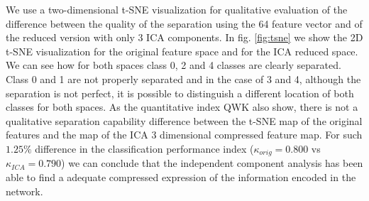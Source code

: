 \documentclass[review]{elsarticle}
\theoremstyle{definition} %
\theoremstyle{remark}
\begin{document}
We use a two-dimensional t-SNE visualization \cite{maaten2008visualizing} for qualitative evaluation of the difference between the quality of the separation using the 64 feature vector and of the reduced version with only 3 ICA components. In fig. \ref{fig:tsne} we show the 2D t-SNE visualization for the original feature space and for the ICA reduced space. We can see how for both spaces class 0, 2 and 4 classes are clearly separated. Class 0 and 1 are not properly separated and in the case of 3 and 4, although the separation is not perfect, it is possible to distinguish a different location of both classes for both spaces. As the quantitative index QWK also show, there is not a qualitative separation capability difference between the t-SNE map of the original features and the map of the ICA 3 dimensional compressed feature map. For such $1.25\%$ difference in the classification performance index ($\kappa_{orig} = 0.800$ vs $\kappa_{ICA} = 0.790$) we can conclude that the independent component analysis has been able to find a adequate compressed expression of the information encoded in the network. 
\end{document}
